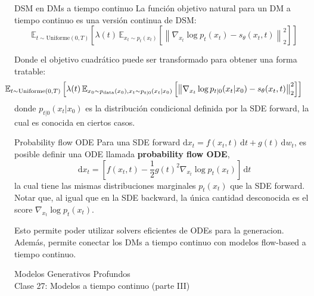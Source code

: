 \documentclass{beamer}
\begin{document}
\begin{frame}{DSM en DMs a tiempo continuo}
    La función objetivo natural para un DM a tiempo continuo es una versión continua de DSM:
    \begin{equation*}
        \mathbb{E}_{t\sim\text{Uniforme}(0,T)}\left[\lambda(t)\,\mathbb{E}_{x_t\sim p_t(x_t)}\left[\left\|\nabla_{x_t} \log p_t(x_t) - s_\theta(x_t,t)\right\|_2^2\right]\right]
    \end{equation*}

    Donde el objetivo cuadrático puede ser transformado para obtener una forma tratable:
    \begin{equation*}
        \hspace{-0.9cm}
        \mathbb{E}_{t\sim\text{Uniforme}(0,T)}\left[\lambda(t)\,\mathbb{E}_{x_0\sim p_{\text{data}}(x_0),x_t\sim p_{t|0}(x_t|x_0)}\left[\left\|\nabla_{x_t} \log p_{t|0}(x_t|x_0) - s_\theta(x_t,t)\right\|_2^2\right]\right]
    \end{equation*}
    donde $p_{t|0}(x_t|x_0)$ es la distribución condicional definida por la SDE forward, la cual es conocida en ciertos casos.
\end{frame}

\begin{frame}{Probability flow ODE}
    Para una SDE forward $\text{d}x_t = f(x_t,t)\,\text{d}t + g(t)\,\text{d}w_t$, es posible definir una ODE llamada \textbf{probability flow ODE},
    \begin{equation*}
        \text{d}x_t = \left[f(x_t,t) - \frac{1}{2}g(t)^2 \nabla_{x_t} \log p_t(x_t)\right]\,\text{d}t
    \end{equation*}
    la cual tiene las mismas distribuciones marginales $p_t(x_t)$ que la SDE forward. Notar que, al igual que en la SDE backward, la única cantidad desconocida es el score $\nabla_{x_t} \log p_t(x_t)$.

    Esto permite poder utilizar solvers eficientes de ODEs para la generacion. Además, permite conectar los DMs a tiempo continuo con modelos flow-based a tiempo continuo.
\end{frame}

\begin{frame}
    \centering
    \Large{Modelos Generativos Profundos}\\
    \large{Clase 27: Modelos a tiempo continuo (parte III)}
\end{frame}
\end{document}
